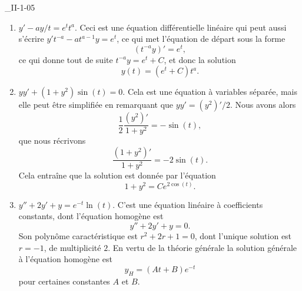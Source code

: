 \begin{corrige}{_II-1-05}
\begin{enumerate}
	\item $y'-ay/t=e^tt^a$.
Ceci est une équation différentielle linéaire qui peut aussi s'écrire $y't^{-a}-at^{a-1}y=e^t$, ce qui met l'équation de départ sous la forme
\begin{equation}
	(t^{-a}y)'=e^t,
\end{equation}
ce qui donne tout de suite $t^{-a}y=e^t+C$, et donc la solution
\begin{equation}
	y(t)=(e^t+C)t^a.
\end{equation}

	\item $yy'+(1+y^2)\sin(t)=0$.
Cela est une équation à variables séparée, mais elle peut être simplifiée en remarquant que $yy'=(y^2)'/2$. Nous avons alors
\begin{equation}
	\frac{ 1 }{2}\frac{ (y^2)' }{ 1+y^2 }=-\sin(t),
\end{equation}
que nous récrivons
\begin{equation}
	\frac{ (1+y^2)' }{ 1+y^2 }=-2\sin(t).
\end{equation}
Cela entraîne que la solution est donnée par l'équation
\begin{equation}
	1+y^2=C e^{2\cos(t)}.
\end{equation}

\item
$y''+2y'+y= e^{-t}\ln(t)$.
C'est une équation linéaire à coefficients constants, dont l'équation homogène est
\begin{equation}
	y''+2y'+y=0.
\end{equation}
Son polynôme caractéristique est $r^2+2r+1=0$, dont l'unique solution est $r=-1$, de multiplicité $2$. En vertu de la théorie générale la solution générale à l'équation homogène est 
\begin{equation}
	y_H=(At+B) e^{-t}
\end{equation}
pour certaines constantes $A$ et $B$. 


\end{enumerate}
\end{corrige}
